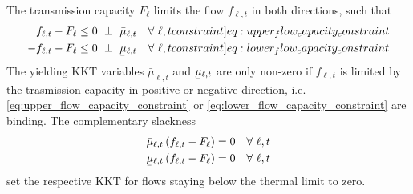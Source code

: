 \documentclass[11pt,twocolumn]{article}
\newcommand{\ubar}[1]{\underaccent{\bar}{#1}}
\newcommand{\capacityFlow}{F_{\ell}}
\newcommand{\mulowerflow}{\ubar{\mu}_{\ell,t}}
\newcommand{\muupperflow}{\bar{\mu}_{\ell,t}}
\newcommand{\flow}{f_{\ell,t}}
\newcommand{\resultsin}[1]{\hspace{6pt} \bot  \hspace{6pt} #1}
\newcommand{\Forall}[1]{\hspace{10pt} \forall \,\, #1 }
\begin{document}
The transmission capacity $\capacityFlow$ limits the flow $\flow$ in both directions, such that 
\begin{align}
\flow - \capacityFlow &\le 0 \resultsin{\muupperflow} \Forall{\ell,t} 
\label[constraint]{eq:upper_flow_capacity_constraint} \\
- \flow - \capacityFlow &\le 0 \resultsin{\mulowerflow} \Forall{\ell,t} 
\label[constraint]{eq:lower_flow_capacity_constraint}
\end{align}
The yielding KKT variables $\muupperflow$ and $\mulowerflow$ are only non-zero if $\flow$ is limited by the trasmission capacity in positive or negative direction, i.e. \cref{eq:upper_flow_capacity_constraint} or \cref{eq:lower_flow_capacity_constraint} are binding. The complementary slackness 
\begin{align}
\muupperflow \left( \flow - \capacityFlow \right)  &= 0 \Forall{\ell,t}
\label{eq:complementary_slackness_upper_flow} \\
\mulowerflow \left( \flow - \capacityFlow \right) &=  0 \Forall{\ell,t}
\label{eq:complementary_slackness_lower_flow} 
\end{align}
set the respective KKT for flows staying below the thermal limit to zero. 
\\
\end{document}

